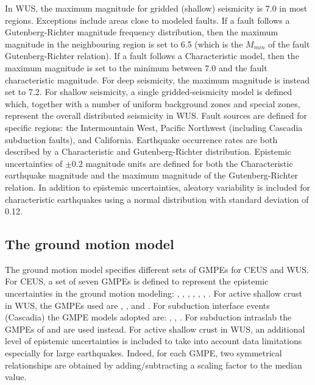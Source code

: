 In WUS, the maximum magnitude for gridded (shallow) seismicity is 7.0 in most
regions. Exceptions include areas close to modeled faults. If a fault follows a
Gutenberg-Richter magnitude frequency distribution, then the maximum magnitude
in the neighbouring region is set to 6.5 (which is the $M_{min}$ of the fault
Gutenberg-Richter relation). If a fault follows a Characteristic model, then the
maximum magnitude is set to the minimum between 7.0 and the fault characteristic
magnitude. For deep seismicity, the maximum magnitude is instead set to 7.2. For
shallow seismicity, a single gridded-seismicity model is defined which, together
with a number of uniform background zones and special zones, represent the
overall distributed seismicity in WUS. Fault sources are defined for specific
regions: the Intermountain West, Pacific Northwest (including Cascadia
subduction faults), and California. Earthquake occurrence rates are both
described by a Characteristic and Gutenberg-Richter distribution. Epistemic
uncertainties of $\pm 0.2$ magnitude units are defined for both the
Characteristic earthquake magnitude and the maximum magnitude of the
Gutenberg-Richter relation. In addition to epistemic uncertainties, aleatory
variability is included for characteristic earthquakes using a normal
distribution with standard deviation of 0.12.
%
\subsection{The ground motion model}
The ground motion model specifies different sets of GMPEs for CEUS and WUS. For
CEUS, a set of seven GMPEs is defined to represent the epistemic uncertainties
in the ground motion modeling: \citet{frankel1996}, \citet{somerville2001},
\citet{campbell2003SCR}, \citet{toro1997}, \citet{atkinson2006},
\citet{tavakoli2005}, \citet{silva2002}. For active shallow crust in WUS, the
GMPEs used are \citet{boore2008}, \citet{campbell2008}, and \citet{chiou2008}.
For subduction interface events (Cascadia) the GMPE models adopted are:
\citet{y1997}, \citet{ab2003}, \citet{zhao2006}. For subduction intraslab the
GMPEs of \citet{geomatrix1993} and \citet{ab2003} are used instead. For active
shallow crust in WUS, an additional level of epistemic uncertainties is included
to take into account data limitations especially for large earthquakes. Indeed,
for each GMPE, two symmetrical relationships are obtained by adding/subtracting
a scaling factor to the median value.
%
